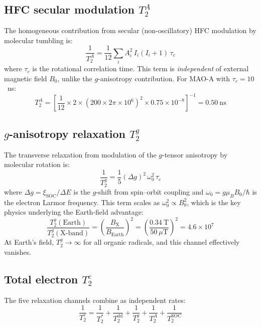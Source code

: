 \documentclass[11pt]{article}
\begin{document}
\subsection{HFC secular modulation $T_2^A$}

The homogeneous contribution from secular (non-oscillatory) HFC modulation by molecular tumbling is\cite{Abragam1961}:
\begin{equation}
\frac{1}{T_2^A} = \frac{1}{12}\sum_{i} A_i^2\, I_i(I_i + 1)\,\tau_c
\label{eq:T2A}
\end{equation}
where $\tau_c$ is the rotational correlation time. This term is \emph{independent} of external magnetic field $B_0$, unlike the $g$-anisotropy contribution. For MAO-A with $\tau_c = 10$~ns:
\begin{equation}
T_2^A = \left[\frac{1}{12} \times 2 \times (200 \times 2\pi \times 10^6)^2 \times 0.75 \times 10^{-8}\right]^{-1} = 0.50~\mathrm{ns}
\end{equation}

\subsection{$g$-anisotropy relaxation $T_2^g$}

The transverse relaxation from modulation of the $g$-tensor anisotropy by molecular rotation is\cite{Atkins1972}:
\begin{equation}
\frac{1}{T_2^g} = \frac{1}{5}(\Delta g)^2\,\omega_0^2\,\tau_c
\label{eq:T2g}
\end{equation}
where $\Delta g = \xi_\mathrm{SOC}/\Delta E$ is the $g$-shift from spin--orbit coupling and $\omega_0 = g\mu_B B_0/\hbar$ is the electron Larmor frequency. This term scales as $\omega_0^2 \propto B_0^2$, which is the key physics underlying the Earth-field advantage:
\begin{equation}
\frac{T_2^g(\mathrm{Earth})}{T_2^g(\mathrm{X\text{-}band})} = \left(\frac{B_\mathrm{X}}{B_\mathrm{Earth}}\right)^2 = \left(\frac{0.34~\mathrm{T}}{50~\mu\mathrm{T}}\right)^2 = 4.6 \times 10^7
\end{equation}
At Earth's field, $T_2^g \rightarrow \infty$ for all organic radicals, and this channel effectively vanishes.

\subsection{Total electron $T_2^e$}

The five relaxation channels combine as independent rates:
\begin{equation}
\frac{1}{T_2^e} = \frac{1}{T_2^*} + \frac{1}{T_2^\mathrm{dd}} + \frac{1}{T_2^g} + \frac{1}{T_2^A} + \frac{1}{T_2^\mathrm{SOC}}
\label{eq:T2e_total}
\end{equation}
\end{document}
